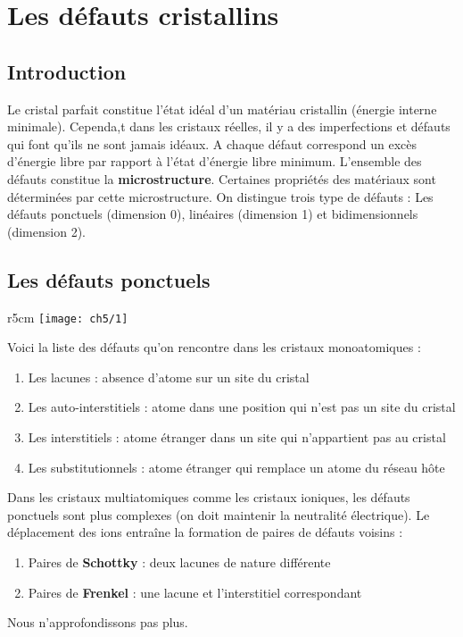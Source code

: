 
\chapter{Les défauts cristallins}
\section{Introduction}
	Le cristal parfait constitue l'état idéal d'un matériau cristallin (énergie interne minimale). Cependa,t dans les cristaux réelles, il y a des imperfections et défauts qui font qu'ils ne sont jamais idéaux. A chaque défaut correspond un excès d'énergie libre par rapport à l'état d'énergie libre minimum. L'ensemble des défauts constitue la \textbf{microstructure}. Certaines propriétés des matériaux sont déterminées par cette microstructure. On distingue trois type de défauts : Les défauts ponctuels (dimension 0), linéaires (dimension 1) et bidimensionnels (dimension 2). 
	
\section{Les défauts ponctuels}
	\begin{wrapfigure}[3]{r}{5cm}
	\vspace{-5mm}
	\texttt{[image: ch5/1]}
	\end{wrapfigure}
	Voici la liste des défauts qu'on rencontre dans les cristaux monoatomiques :
	\begin{enumerate}
		\item Les lacunes : absence d'atome sur un site du cristal
		\item Les auto-interstitiels : atome dans une position qui n'est pas un site du cristal
		\item Les interstitiels : atome étranger dans un site qui n'appartient pas au cristal
		\item Les substitutionnels : atome étranger qui remplace un atome du réseau hôte 
	\end{enumerate}
	Dans les cristaux multiatomiques comme les cristaux ioniques, les défauts ponctuels sont plus complexes (on doit maintenir la neutralité électrique). Le déplacement des ions entraîne la formation de paires de défauts voisins : 
	\begin{enumerate}
		\item Paires de \textbf{Schottky} : deux lacunes de nature différente
		\item Paires de \textbf{Frenkel} : une lacune et l'interstitiel correspondant
\end{enumerate}	 
Nous n'approfondissons pas plus. 


